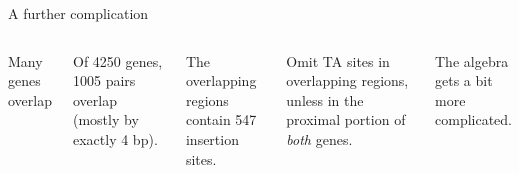 \documentclass[aspectratio=169,12pt,t]{beamer}
\begin{document}
\begin{frame}{A further complication}

\begin{columns}


{\color{title} Many genes overlap}

\bi

\item Of 4250 genes, 1005 pairs overlap (mostly by exactly 4 bp).
\item The overlapping regions contain 547 insertion sites.
\item {\vhilit Omit TA sites in overlapping regions, unless in the
proximal portion of \emph{both\/} genes}.
\item The algebra gets a bit more complicated.
\ei



\end{columns}

\note{
}
\end{frame}
\end{document}

